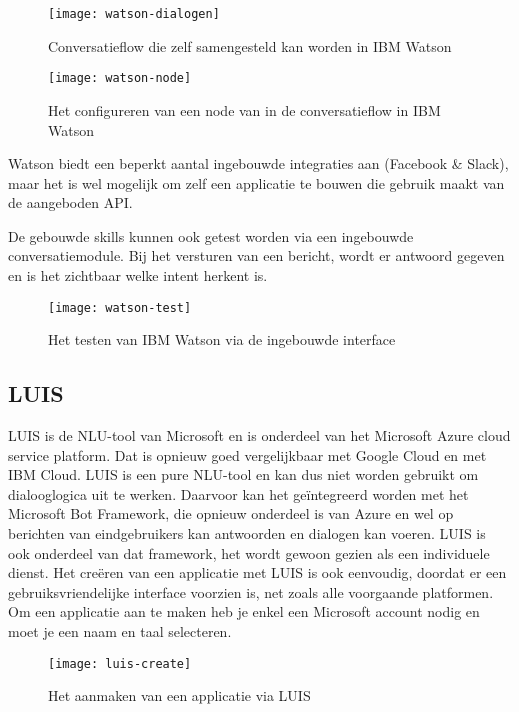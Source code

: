 \begin{figure}[H]
    \label{fig:watson-dialogen}
    \centering
    \texttt{[image: watson-dialogen]}
    \caption{Conversatieflow die zelf samengesteld kan worden in IBM Watson}
\end{figure}

\begin{figure}[H]
    \label{fig:watson-node}
    \centering
    \texttt{[image: watson-node]}
    \caption{Het configureren van een node van in de conversatieflow in IBM Watson}
\end{figure}

Watson biedt een beperkt aantal ingebouwde integraties aan (Facebook \& Slack), maar het is wel mogelijk om zelf een applicatie te bouwen die gebruik maakt van de aangeboden API.

De gebouwde skills kunnen ook getest worden via een ingebouwde conversatiemodule. Bij het versturen van een bericht, wordt er antwoord gegeven en is het zichtbaar welke intent herkent is.

\begin{figure}[H]
    \label{fig:watson-test}
    \centering
    \texttt{[image: watson-test]}
    \caption{Het testen van IBM Watson via de ingebouwde interface}
\end{figure}

\subsection{LUIS}
\label{subsec:werking-platformen-luis}

LUIS is de NLU-tool van Microsoft en is onderdeel van het Microsoft Azure cloud service platform. Dat is opnieuw goed vergelijkbaar met Google Cloud en met IBM Cloud. LUIS is een pure NLU-tool en kan dus niet worden gebruikt om dialooglogica uit te werken. Daarvoor kan het geïntegreerd worden met het Microsoft Bot Framework, die opnieuw onderdeel is van Azure en wel op berichten van eindgebruikers kan antwoorden en dialogen kan voeren. LUIS is ook onderdeel van dat framework, het wordt gewoon gezien als een individuele dienst. Het creëren van een applicatie met LUIS is ook eenvoudig, doordat er een gebruiksvriendelijke interface voorzien is, net zoals alle voorgaande platformen. Om een applicatie aan te maken heb je enkel een Microsoft account nodig en moet je een naam en taal selecteren.

\begin{figure}[H]
    \label{fig:luis-create}
    \centering
    \texttt{[image: luis-create]}
    \caption{Het aanmaken van een applicatie via LUIS}
\end{figure}

